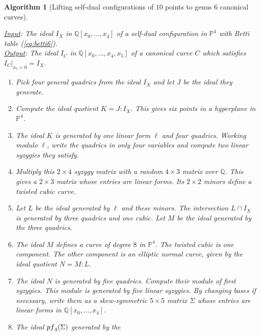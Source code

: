 \documentclass[12pt]{extarticle}
\newtheorem{algo}[theorem]{Algorithm}
\theoremstyle{definition}
\numberwithin{theorem}{section}
\theoremstyle{plain}\newtheorem{ithm}{Theorem}
\newcommand{\PP}{\mathbb{P}}
\newcommand{\QQ}{\mathbb{Q}}
\begin{document}
\begin{algo}[Lifting self-dual configurations of $10$ points to genus $6$ canonical curves] \label{alg:genus6}

\underline{{\rm Input}}: The ideal $I_X$ in $\QQ[x_0,\ldots,x_4]$ of a self-dual configuration in $\PP^4$
with Betti table (\ref{eq:betti6}). \smallskip
\\
\underline{{\rm Output}}: The ideal $I_C$ in $\QQ[x_0,\ldots,x_4,x_5]$ of a canonical curve $C$
which  satisfies $I_C|_{x_5 = 0}= I_X$. 
\begin{enumerate}
\item Pick four general quadrics from the ideal $I_X$ and let $J$ be the ideal they generate. \vspace{-0.2cm}
\item Compute the ideal quotient $K =J:I_X$. 
This gives six points in a hyperplane in $\PP^4$. \vspace{-0.2cm}
\item The ideal $K$ is generated by one linear form $\ell$ and four quadrics. Working modulo $\ell$,
write the quadrics in only four variables and compute two linear syzygies they satisfy.  \vspace{-0.2cm}
\item Multiply this $2 \times 4$ syzygy matrix with a random $4 \times 3$ matrix over $\QQ$.
This gives a $2 \times 3$ matrix whose entries are linear forms.
Its $2 \times 2$ minors define a twisted cubic curve.  \vspace{-0.2cm}
\item Let $L$ be the ideal generated by $\ell$ and these minors. The intersection $L \cap I_X$
is generated by three quadrics and one cubic. Let $M$ be the ideal generated by the three quadrics. \vspace{-0.2cm}
\item The ideal $M$ defines a curve of degree $8$ in $\PP^4$. The twisted cubic
is one component. The other component is an elliptic normal curve, given by
 the ideal quotient $N = M:L$. \vspace{-0.2cm}
\item
The ideal $N$ is generated by five quadrics. Compute their module of first syzygies.
This module is generated by five linear syzygies.
By changing bases if necessary, write them
 as a skew-symmetric $5 \times 5$ matrix $\Sigma$  whose entries
are linear forms in $\QQ[x_0,\ldots,x_4]$. \vspace{-0.2cm}
\item The ideal ${\rm pf}_4(\Sigma)$ generated by the

\end{enumerate}
\end{algo}
\end{document}
